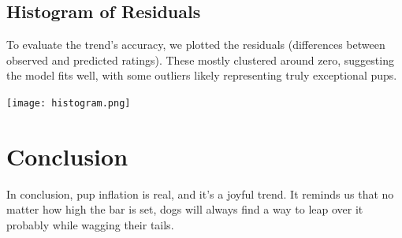 \documentclass{article}
\begin{document}
\subsection*{Histogram of Residuals}
To evaluate the trend’s accuracy, we plotted the residuals (differences between observed and predicted ratings). These mostly clustered around zero, suggesting the model fits well, with some outliers likely representing truly exceptional pups.

\begin{center}
\texttt{[image: histogram.png]} %
\end{center}

\section*{Conclusion}
In conclusion, pup inflation is real, and it’s a joyful trend. It reminds us that no matter how high the bar is set, dogs will always find a way to leap over it probably while wagging their tails.
\end{document}
